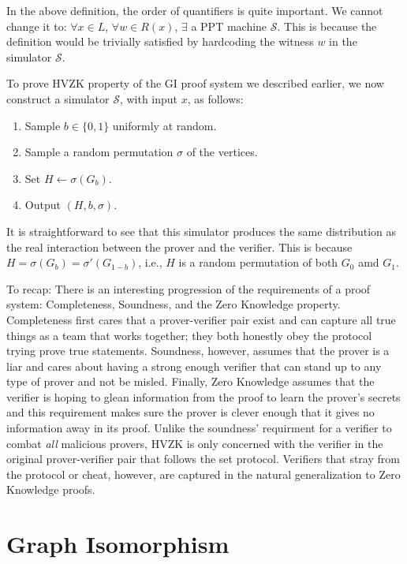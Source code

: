\begin{remark}
In the above definition, the order of quantifiers is quite important. We cannot change it to: $\forall x \in L$, $\forall w\in R(x)$, $\exists$ a PPT machine $\mathcal{S}$. This is because the definition would be trivially satisfied by hardcoding the witness $w$ in the simulator $\mathcal{S}$.
\end{remark}

To prove HVZK property of the GI proof system we described earlier, we now construct a simulator $\mathcal{S}$, with input $x$, as follows:
\begin{enumerate}
	\item Sample $b\in\{0,1\}$ uniformly at random.
	\item Sample a random permutation $\sigma$ of the vertices.
	\item Set $H \gets \sigma(G_b)$.
	\item Output $(H, b, \sigma)$.
\end{enumerate}
It is straightforward to see that this simulator produces the same distribution as the real interaction between the prover and the verifier. This is because $H = \sigma(G_b) = \sigma'(G_{1-b})$, i.e., $H$ is a random permutation of both $G_0$ amd $G_1$. 
	
To recap: There is an interesting progression of the requirements of a proof system: Completeness, Soundness, and the Zero Knowledge property.  Completeness first cares that a prover-verifier pair exist and can capture all true things as a team that works together; they both honestly obey the protocol trying prove true statements.  Soundness, however, assumes that the prover is a liar and cares about having a strong enough verifier that can stand up to any type of prover and not be misled.  Finally, Zero Knowledge assumes that the verifier is hoping to glean information from the proof to learn the prover's secrets and this requirement makes sure the prover is clever enough that it gives no information away in its proof. Unlike the soundness' requirment for a verifier to combat \textit{all} malicious provers, HVZK is only concerned with the verifier in the original prover-verifier pair that follows the set protocol. Verifiers that stray from the protocol or cheat, however, are captured in the natural generalization to Zero Knowledge proofs.

\section{Graph Isomorphism}

